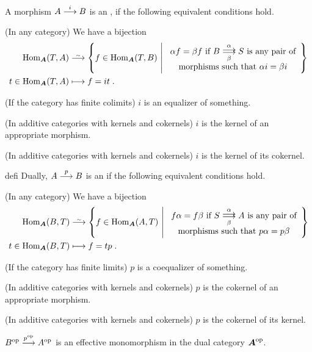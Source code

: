 \documentclass[a4paper,parskip=half,numbers=enddot, DIV=12]{scrreprt}
\begin{document}
	\begin{defi}
		A morphism $A\morphism[i]B$ is an , if the following equivalent conditions hold.
		\begin{alphanumerate}
			\item (In any category) We have a bijection
			\begin{align*}
			\Hom_{\cat A}(T,A)&\isomorphism\left\{f\in\Hom_{\cat A}(T,B)\st 
			\begin{array}{c}
			\alpha f=\beta f\text{ if }B\doublemorphism[\alpha][\beta]S\text{ is any pair of}\\ 
			\text{morphisms such that }\alpha i=\beta i
			\end{array}
			\right\}\\
			t\in\Hom_{\cat A}(T,A) &\longmapsto f=it\;.
			\end{align*}
			\item (If the category has finite colimits) $i$ is an equalizer of something.
			\item (In additive categories with kernels and cokernels) $i$ is the kernel of an appropriate morphism.
			\item (In additive categories with kernels and cokernels) $i$ is the kernel of its cokernel.
		\end{alphanumerate}
	\end{defi}
	\begin{varthm}{defi}
		Dually, $A\morphism[p]B$ is an  if the following equivalent conditions hold.
		\begin{alphanumerate}
			\item (In any category) We have a bijection
			\begin{align*}
			\Hom_{\cat A}(B,T)&\isomorphism\left\{f\in\Hom_{\cat A}(A,T)\st 
			\begin{array}{c}
			f\alpha =f\beta\text{ if }S\doublemorphism[\alpha][\beta]A\text{ is any pair of}\\
			\text{morphisms such that }p\alpha =p\beta 
			\end{array}
			\right\}\\
			t\in\Hom_{\cat A}(B,T) &\longmapsto f=tp\;.
			\end{align*}
			\item (If the category has finite limits) $p$ is a coequalizer of something.
			\item (In additive categories with kernels and cokernels) $p$ is the cokernel of an appropriate morphism.
			\item (In additive categories with kernels and cokernels) $p$ is the cokernel of its kernel.
			\item $B^\op\morphism[p^\op]A^\op$ is an effective monomorphism in the dual category ${\cat A}^\op$.
		\end{alphanumerate}
	\end{varthm}
\end{document}
